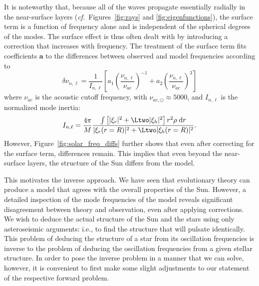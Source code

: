 It is noteworthy that, because all of the waves propagate essentially radially in the near-surface layers (\emph{cf.}~Figures~\ref{fig:rays} and \ref{fig:eigenfunctions}), the surface term is a function of frequency alone and is independent of the spherical degrees of the modes. 
The surface effect is thus often dealt with by introducing a correction that increases with frequency. %
The \citet{2014A&A...568A.123B} treatment of the surface term fits coefficients $\mathbf a$ to the differences between observed and model frequencies according to
\begin{equation} \label{eq:BallGizon-surfterm}
    \delta \nu_{n,\ell} 
    = 
    \frac{1}{I_{n,\ell}} \left[ 
        a_1 \left( 
            \frac{\nu_{n,\ell}}{\nu_{ac}} 
        \right)^{-1} 
        + 
        a_2 \left( 
            \frac{\nu_{n,\ell}}{\nu_{ac}} 
        \right)^{3} 
    \right] %
\end{equation}
where $\nu_{ac}$ is the acoustic cutoff frequency, with ${\nu_{ac,\odot} \approx 5000}$, and $I_{n,\ell}$ is the normalized mode inertia:
\begin{equation} \label{eq:normalized-mode-inertia}
    I_{n,\ell}
    =
    \frac{4\pi}{M}
    \frac{\int 
            \left[
                |\xi_r|^2
                +
                \Ltwo |\xi_h|^2
            \right] 
            r^2\rho
        \;\text{d}r}{
            |\xi_r(r=R)|^2
            +
            \Ltwo
            |\xi_h(r=R)|^2
        }.
\end{equation}
However, Figure~\ref{fig:solar_freq_diffs} further shows that even after correcting for the surface term, differences remain. 
This implies that even beyond the near-surface layers, the structure of the Sun differs from the model. 

This motivates the inverse approach. 
We have seen that evolutionary theory can produce a model that agrees with the overall properties of the Sun. 
However, a detailed inspection of the mode frequencies of the model reveals significant disagreement between theory and observation, even after applying corrections. 
We wish to deduce the actual structure of the Sun and the stars using only asteroseismic arguments: i.e., to find the structure that will pulsate identically. 
This problem of deducing the structure of a star from its oscillation frequencies is inverse to the problem of deducing the oscillation frequencies from a given stellar structure. 
In order to pose the inverse problem in a manner that we can solve, however, it is convenient to first make some slight adjustments to our statement of the respective forward problem. 

